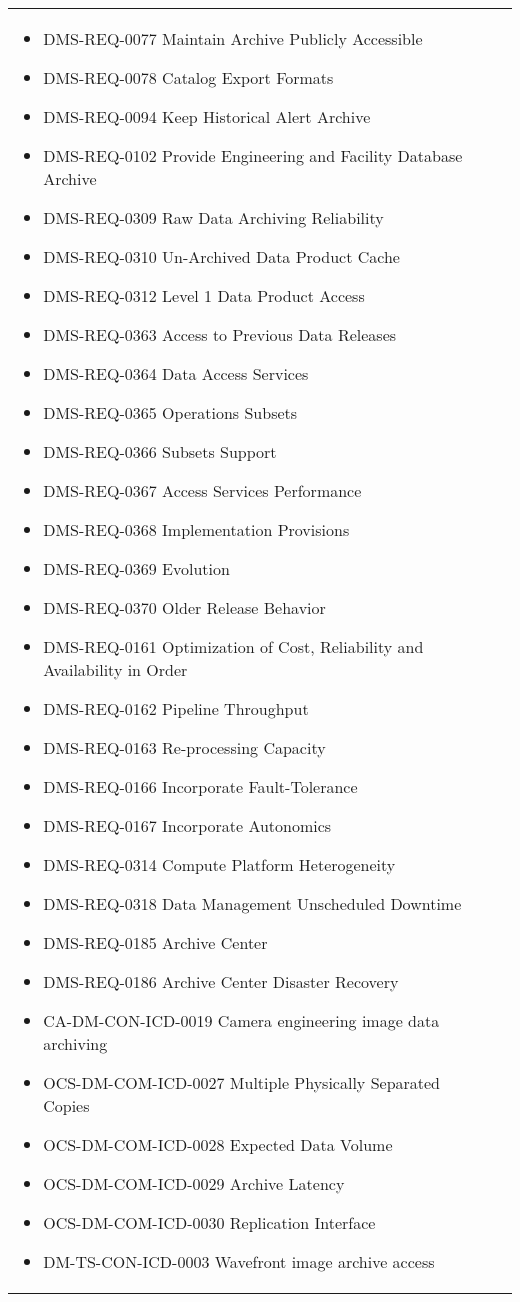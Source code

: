 \begin{xtabular}{lp{0.7\textwidth}}
\begin{itemize}
\item DMS-REQ-0077 Maintain Archive Publicly Accessible
\item DMS-REQ-0078 Catalog Export Formats
\item DMS-REQ-0094 Keep Historical Alert Archive
\item DMS-REQ-0102 Provide Engineering and Facility Database Archive
\item DMS-REQ-0309 Raw Data Archiving Reliability
\item DMS-REQ-0310 Un-Archived Data Product Cache
\item DMS-REQ-0312 Level 1 Data Product Access
\item DMS-REQ-0363 Access to Previous Data Releases
\item DMS-REQ-0364 Data Access Services
\item DMS-REQ-0365 Operations Subsets
\item DMS-REQ-0366 Subsets Support
\item DMS-REQ-0367 Access Services Performance
\item DMS-REQ-0368 Implementation Provisions
\item DMS-REQ-0369 Evolution
\item DMS-REQ-0370 Older Release Behavior
\item DMS-REQ-0161 Optimization of Cost, Reliability and Availability in Order
\item DMS-REQ-0162 Pipeline Throughput
\item DMS-REQ-0163 Re-processing Capacity
\item DMS-REQ-0166 Incorporate Fault-Tolerance
\item DMS-REQ-0167 Incorporate Autonomics
\item DMS-REQ-0314 Compute Platform Heterogeneity
\item DMS-REQ-0318 Data Management Unscheduled Downtime
\item DMS-REQ-0185 Archive Center
\item DMS-REQ-0186 Archive Center Disaster Recovery
\item CA-DM-CON-ICD-0019 Camera engineering image data archiving
\item OCS-DM-COM-ICD-0027 Multiple Physically Separated Copies
\item OCS-DM-COM-ICD-0028 Expected Data Volume
\item OCS-DM-COM-ICD-0029 Archive Latency
\item OCS-DM-COM-ICD-0030 Replication Interface
\item DM-TS-CON-ICD-0003 Wavefront image archive access

\end{itemize}
\end{xtabular}
